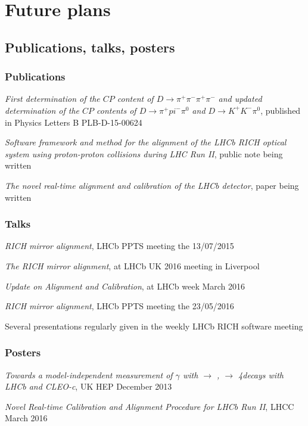 \setcounter{chapter}{3}
\chapter*{Future plans}

\section{Publications, talks, posters}
\subsection{Publications}
\item \textit{First determination of the $CP$ content of $D \to \pi^+\pi^-\pi^+\pi^-$ and updated determination of the $CP$ contents of  $D \to \pi^+pi^-\pi^0$ and  $D \to K^+K^-\pi^0$}, published in Physics Letters B PLB-D-15-00624
\item \textit{Software framework and method for the alignment of the LHCb RICH optical system using proton-proton collisions during LHC Run II}, public note being written
\item \textit{The novel real-time alignment and calibration of the LHCb detector}, paper being written

\subsection{Talks}
\item \textit{RICH mirror alignment}, LHCb PPTS meeting the 13/07/2015
\item \textit{The RICH mirror alignment}, at LHCb UK 2016 meeting in Liverpool 
\item \textit{Update on Alignment and Calibration}, at LHCb week March 2016
\item \textit{RICH mirror alignment}, LHCb PPTS meeting the 23/05/2016
\item Several presentations regularly given in the weekly LHCb RICH software meeting

\subsection{Posters}
\item \textit{Towards a model-independent measurement of $\gamma$ with \B $\rightarrow$ \D \kaon , \D $\rightarrow$ 4\pion decays with LHCb and CLEO-c}, UK HEP December 2013
\item \textit{Novel Real-time Calibration and Alignment Procedure for LHCb Run II}, LHCC March 2016



